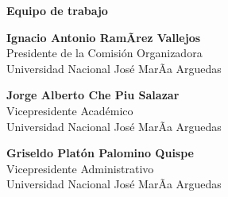 \begin{center}
{\bf \Huge Equipo de trabajo}
\end{center}
\vspace{1cm}

\begin{center}
\textbf{Ignacio Antonio RamÃ­rez Vallejos}\\
Presidente de la Comisión Organizadora \\
Universidad Nacional José MarÃ­a Arguedas \\
\end{center}

\begin{center}
\textbf{Jorge Alberto Che Piu Salazar}\\
Vicepresidente Académico \\
Universidad Nacional José MarÃ­a Arguedas \\
\end{center}

\begin{center}
\textbf{Griseldo Platón Palomino Quispe}\\
Vicepresidente Administrativo \\
Universidad Nacional José MarÃ­a Arguedas \\
\end{center}






